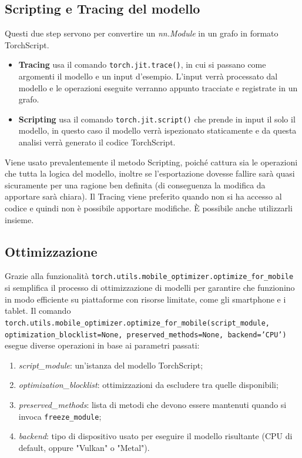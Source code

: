 \subsection{Scripting e Tracing del modello}
Questi due step\cite{TracingVSScripting} servono per convertire un \textit{nn.Module} in un grafo in formato TorchScript.
\begin{itemize}
    \item \textbf{Tracing} usa il comando \texttt{torch.jit.trace()}, in cui si passano come argomenti il modello e un input d'esempio. L'input verrà processato
    dal modello e le operazioni eseguite verranno appunto tracciate e registrate in un grafo.
    \item \textbf{Scripting} usa il comando \texttt{torch.jit.script()} che prende in input il solo il modello, in questo caso il modello verrà ispezionato
    staticamente e da questa analisi verrà generato il codice TorchScript.
\end{itemize}
Viene usato prevalentemente il metodo Scripting, poiché cattura sia le operazioni che tutta la logica del modello, inoltre se l'esportazione dovesse fallire sarà
quasi sicuramente per una ragione ben definita (di conseguenza la modifica da apportare sarà chiara). Il Tracing viene preferito quando non si ha accesso al codice
e quindi non è possibile apportare modifiche. È possibile anche utilizzarli insieme.

\subsection{Ottimizzazione}
\label{sec:ottimizzazione}
Grazie alla funzionalità \texttt{torch.utils.mobile\_optimizer.optimize\_for\_mobile}\cite{Ottimizzazione} si semplifica il processo di ottimizzazione
di modelli per garantire che funzionino in modo efficiente su piattaforme con risorse limitate, come gli smartphone e i tablet.
Il comando \texttt{torch.utils.mobile\_optimizer.optimize\_for\_mobile(script\_module, optimization\_blocklist=None, preserved\_methods=None, backend='CPU')} esegue
diverse operazioni in base ai parametri passati:
\begin{enumerate}
    \item \textit{script\_module}: un'istanza del modello TorchScript;
    \item \textit{optimization\_blocklist}: ottimizzazioni da escludere tra quelle disponibili;
    \item \textit{preserved\_methods}: lista di metodi che devono essere mantenuti quando si invoca \texttt{freeze\_module};
    \item \textit{backend}: tipo di dispositivo usato per eseguire il modello risultante (CPU di default, oppure "Vulkan" o "Metal").
\end{enumerate}

